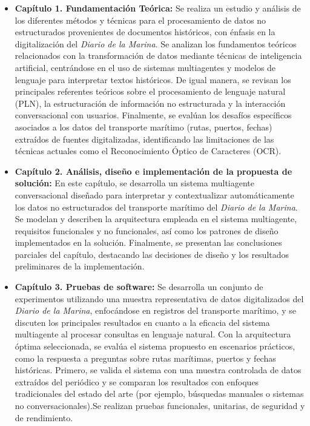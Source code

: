 \begin{itemize}
	\item \textbf{Capítulo 1. Fundamentación Teórica:} Se realiza un estudio y análisis de los diferentes métodos y técnicas para el procesamiento de datos no estructurados provenientes de documentos históricos, con énfasis en la digitalización del \textit{Diario de la Marina}. Se analizan los fundamentos teóricos relacionados con la transformación de datos mediante técnicas de inteligencia artificial, centrándose en el uso de sistemas multiagentes y modelos de lenguaje para interpretar textos históricos. De igual manera, se revisan los principales referentes teóricos sobre el procesamiento de lenguaje natural (PLN), la estructuración de información no estructurada y la interacción conversacional con usuarios. Finalmente, se evalúan los desafíos específicos asociados a los datos del transporte marítimo (rutas, puertos, fechas) extraídos de fuentes digitalizadas, identificando las limitaciones de las técnicas actuales como el Reconocimiento Óptico de Caracteres (OCR).
	
	\item \textbf{Capítulo 2. Análisis, diseño e implementación de la propuesta de solución:} En este capítulo, se desarrolla un sistema multiagente conversacional diseñado para interpretar y contextualizar automáticamente los datos no estructurados del transporte marítimo del \textit{Diario de la Marina}. Se modelan y describen la arquitectura empleada en el sistema multiagente, requisitos funcionales y no funcionales, así como los patrones de diseño implementados en la solución. Finalmente, se presentan las conclusiones parciales del capítulo, destacando las decisiones de diseño y los resultados preliminares de la implementación.
	
	\item \textbf{Capítulo 3. Pruebas de software:} Se desarrolla un conjunto de experimentos utilizando una muestra representativa de datos digitalizados del \textit{Diario de la Marina}, enfocándose en registros del transporte marítimo, y se discuten los principales resultados en cuanto a la eficacia del sistema multiagente al procesar consultas en lenguaje natural. Con la arquitectura óptima seleccionada, se evalúa el sistema propuesto en escenarios prácticos, como la respuesta a preguntas sobre rutas marítimas, puertos y fechas históricas. Primero, se valida el sistema con una muestra controlada de datos extraídos del periódico y se comparan los resultados con enfoques tradicionales del estado del arte (por ejemplo, búsquedas manuales o sistemas no conversacionales).Se realizan pruebas funcionales, unitarias, de seguridad y de rendimiento.
\end{itemize}


	












